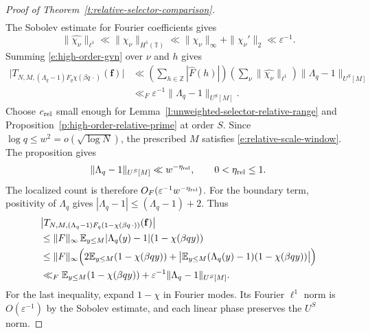 \documentclass[12pt]{amsart}
\newcommand{\1}{\mathbf 1}
\theoremstyle{definition}
\begin{document}
\begin{proof}[Proof of Theorem~\ref{t:relative-selector-comparison}]
\begin{equation}
\begin{aligned}
\end{aligned}
\end{equation}
The Sobolev estimate for Fourier coefficients gives
\[
 \|\widehat{\chi_\nu}\|_{\ell^1}
 \ll \|\chi_\nu\|_{H^1(\mathbb T)}
 \ll \|\chi_\nu\|_\infty+\|\chi_\nu'\|_2
 \ll \varepsilon^{-1}.
\]
Summing \eqref{e:high-order-gvn} over \(\nu\) and \(h\) gives
\begin{align}\label{e:firstterm}
 \bigl|T_{N,M,(\Lambda_q-1)F_q\chi(\beta q\,\cdot)}(\mathbf f)\bigr|
 &\ll \left(\sum_{h\in\mathbb Z}|\widehat F(h)|\right)
       \left(\sum_\nu\|\widehat{\chi_\nu}\|_{\ell^1}\right)
       \|\Lambda_q-1\|_{U^S[M]}\\
 &\ll_F \varepsilon^{-1}\|\Lambda_q-1\|_{U^S[M]}\nonumber.
\end{align}
Choose \(c_{\rm rel}\) small enough for
Lemma~\ref{l:unweighted-selector-relative-range} and
Proposition~\ref{p:high-order-relative-prime} at order \(S\).
Since \(\log q\le w^2=o(\sqrt{\log N})\), the prescribed \(M\)
satisfies \eqref{e:relative-scale-window}. The proposition gives
\begin{align}\label{e:second2}
    \|\Lambda_q-1\|_{U^S[M]}\ll w^{-\eta_{\rm rel}},
 \qquad 0<\eta_{\rm rel}\le1.
\end{align}
The localized count is therefore \(O_F(\varepsilon^{-1}w^{-\eta_{\rm rel}})\).
For the boundary term, positivity of \(\Lambda_q\) gives
\(|\Lambda_q-1|\le(\Lambda_q-1)+2\). Thus
\begin{align}\label{e:secondterm}
 &\bigl|T_{N,M,(\Lambda_q-1)F_q(1-\chi(\beta q\,\cdot))}
          (\mathbf f)\bigr|\\
 &\le \|F\|_\infty\,
    \mathbb E_{y\le M}|\Lambda_q(y)-1|(1-\chi(\beta qy))\nonumber\\
 &\le \|F\|_\infty\Bigl(
    2\mathbb E_{y\le M}(1-\chi(\beta qy))
    +\bigl|\mathbb E_{y\le M}(\Lambda_q(y)-1)
                        (1-\chi(\beta qy))\bigr|\Bigr)\nonumber\\
 &\ll_F \mathbb E_{y\le M}(1-\chi(\beta qy))
          +\varepsilon^{-1}\|\Lambda_q-1\|_{U^S[M]}\nonumber.
\end{align}
For the last inequality, expand \(1-\chi\) in Fourier modes.
Its Fourier \(\ell^1\) norm is \(O(\varepsilon^{-1})\) by the
Sobolev estimate, and each linear phase preserves the \(U^S\) norm.


\end{proof}
\end{document}
